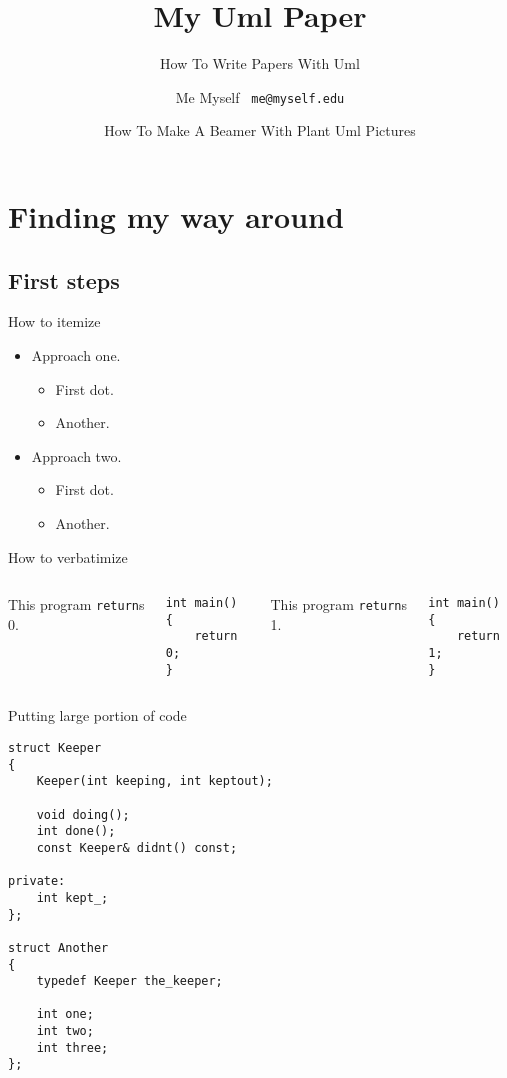 \documentclass{beamer}
\title{My Uml Paper}
\subtitle{How To Write Papers With Uml}
\author[Me]{Me Myself \ \texttt{me@myself.edu}}
\date[UML2015]{How To Make A Beamer With Plant Uml Pictures}
\begin{document}
\begin{frame}
  \titlepage
\end{frame}

\begin{frame}
  \tableofcontents
\end{frame}

\section{Finding my way around}

\subsection{First steps}

\begin{frame}{How to itemize}
  	\begin{itemize}
  	    \item Approach one.
	  	\begin{itemize}
		    \item First dot.
		    \item Another.
	    \end{itemize}  	
  	    \item Approach two.
	  	\begin{itemize}
		    \item First dot.
		    \item Another.
	    \end{itemize}
    \end{itemize}
\end{frame}

\begin{frame}[fragile]{How to verbatimize}
	\begin{columns}
			This program \texttt{return}s 0.
\begin{verbatim}
int main()
{
    return 0;
}
\end{verbatim}
			This program \texttt{return}s 1.
\begin{verbatim}
int main()
{
    return 1;
}
\end{verbatim}
	\end{columns}
\end{frame}

\begin{frame}[fragile]{Putting large portion of code}
\tiny
\begin{verbatim}
struct Keeper
{
    Keeper(int keeping, int keptout);

    void doing();
    int done();
    const Keeper& didnt() const;

private:
    int kept_;
};

struct Another
{
    typedef Keeper the_keeper;

    int one;
    int two;
    int three;
};
\end{verbatim}
\end{frame}
\end{document}
